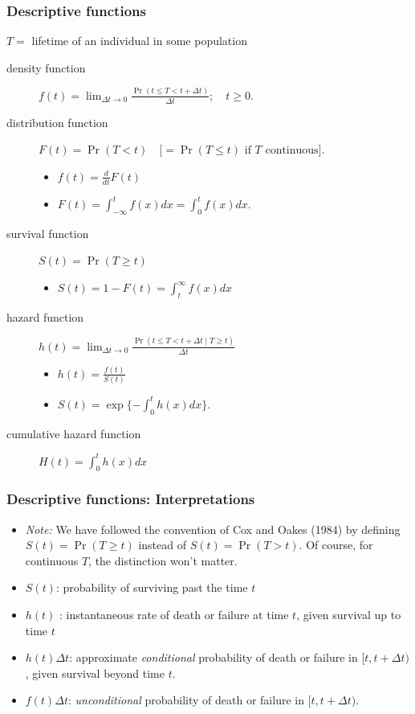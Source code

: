 \documentclass{beamer}
\newenvironment{wideitemize}%
  {\begin{itemize}%
    \setlength{\parskip}{1em}}%
  {\end{itemize}}
\begin{document}
\begin{frame} \frametitle{Descriptive functions}

 $T = $  lifetime of an individual in some population
\begin{description}
\item [density function] $f(t)= \lim_{\Delta t \rightarrow 0} 
  \frac{\Pr(t \leq T < t+\Delta t)}{\Delta t}; \quad t\geq 0.$
\item [distribution function] $F(t) = \Pr(T < t)\quad \mbox{[$=\Pr(T\leq t)$ if $T$ continuous].}$ 
\begin{itemize}
\item $f(t) = \frac{d}{dt} F(t)$
\item $F(t) = \int_{-\infty}^t f(x) dx=\int_0^t f(x)dx.$
\end{itemize}
\item [survival function] $S(t) = \Pr(T \geq t)$
\begin{itemize}
\item $S(t) = 1 - F(t) = \int^{\infty}_t f(x) dx$
\end{itemize}
\item [hazard function] $h(t) = \lim_{\Delta t
  \rightarrow 0} \frac{\Pr(t \leq T < t+\Delta t \mid T \geq
  t)}{\Delta t}$
\begin{itemize}
\item $h(t) = \frac{f(t)}{S(t)}$
\item $S(t)=\exp\{-\int_0^t h(x)dx\}$.


\end{itemize}
\item  [cumulative hazard function] $H(t) = \int_0^th(x)dx  $

\end{description}

\end{frame}

\begin{frame} \frametitle{Descriptive functions: Interpretations}

\begin{wideitemize}
\item \emph{Note:} We have followed the convention of  Cox and Oakes (1984) by defining $S(t) = \Pr(T \geq t)$ instead of $S(t) = \Pr(T > t)$. Of course, for continuous $T$, the distinction won't matter. 
\item $S(t)$: probability of surviving past the time $t$
\item $h(t)$ : instantaneous rate of death or failure at time $t$, given survival up to time $t$
\item $h(t)\Delta t$: approximate \textit{conditional} probability of death or
failure in $[t, t+\Delta t)$, given survival beyond time $t$.
\item $f(t)\Delta t$:  \textit{unconditional} probability of death or
failure in $[t, t+\Delta t)$.
\end{wideitemize}


\end{frame}
\end{document}
